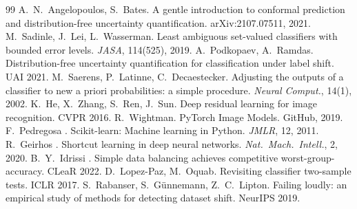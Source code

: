 \documentclass[10pt,twocolumn,letterpaper]{article}
\begin{document}
{\begin{thebibliography}{99}
 A.~N.~Angelopoulos, S.~Bates. A gentle introduction to conformal prediction and distribution-free uncertainty quantification. arXiv:2107.07511, 2021.
 M.~Sadinle, J.~Lei, L.~Wasserman. Least ambiguous set-valued classifiers with bounded error levels. \emph{JASA}, 114(525), 2019.
 A.~Podkopaev, A.~Ramdas. Distribution-free uncertainty quantification for classification under label shift. UAI 2021.
 M.~Saerens, P.~Latinne, C.~Decaestecker. Adjusting the outputs of a classifier to new a priori probabilities: a simple procedure. \emph{Neural Comput.}, 14(1), 2002.
 K.~He, X.~Zhang, S.~Ren, J.~Sun. Deep residual learning for image recognition. CVPR 2016.
 R.~Wightman. PyTorch Image Models. GitHub, 2019.
 F.~Pedregosa \etal. Scikit-learn: Machine learning in Python. \emph{JMLR}, 12, 2011.
 R.~Geirhos \etal. Shortcut learning in deep neural networks. \emph{Nat.\ Mach.\ Intell.}, 2, 2020.
 B.~Y.~Idrissi \etal. Simple data balancing achieves competitive worst-group-accuracy. CLeaR 2022.
 D.~Lopez-Paz, M.~Oquab. Revisiting classifier two-sample tests. ICLR 2017.
 S.~Rabanser, S.~G\"unnemann, Z.~C.~Lipton. Failing loudly: an empirical study of methods for detecting dataset shift. NeurIPS 2019.
\end{thebibliography}
}
\end{document}
